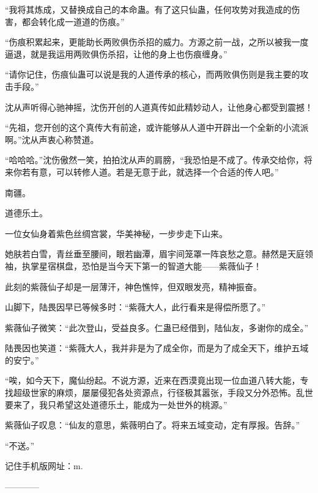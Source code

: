 \begin{this_body}
“我将其炼成，又替换成自己的本命蛊。有了这只仙蛊，任何攻势对我造成的伤害，都会转化成一道道的伤痕。”

“伤痕积累起来，更能助长两败俱伤杀招的威力。方源之前一战，之所以被我一度逼退，就是我运用两败俱伤杀招，让他的身上也伤痕缠身。”

“请你记住，伤痕仙蛊可以说是我的人道传承的核心，而两败俱伤则是我主要的攻击手段。”

沈从声听得心驰神摇，沈伤开创的人道真传如此精妙动人，让他身心都受到震撼！

“先祖，您开创的这个真传大有前途，或许能够从人道中开辟出一个全新的小流派啊。”沈从声衷心称赞道。

“哈哈哈。”沈伤傲然一笑，拍拍沈从声的肩膀，“我恐怕是不成了。传承交给你，将来你若有意，可以转修人道。若是无意于此，就选择一个合适的传人吧。”

南疆。

道德乐土。

一位女仙身着紫色丝绸宫裳，华美神秘，一步步走下山来。

她肤若白雪，青丝垂至腰间，眼若幽潭，眉宇间笼罩一阵哀愁之意。赫然是天庭领袖，执掌星宿棋盘，恐怕是当今天下第一的智道大能——紫薇仙子！

此刻的紫薇仙子却是一层薄汗，神色憔悴，但双眼发亮，精神振奋。

山脚下，陆畏因早已等候多时：“紫薇大人，此行看来是得偿所愿了。”

紫薇仙子微笑：“此次登山，受益良多。仁蛊已经借到，陆仙友，多谢你的成全。”

陆畏因也笑道：“紫薇大人，我并非是为了成全你，而是为了成全天下，维护五域的安宁。”

“唉，如今天下，魔仙纷起。不说方源，近来在西漠竟出现一位血道八转大能，专找超级世家的麻烦，屡屡侵犯各处资源点，行径极其嚣张，手段又分外恐怖。乱世要来了，我只希望这处道德乐土，能成为一处世外的桃源。”

紫薇仙子叹息：“仙友的意思，紫薇明白了。将来五域变动，定有厚报。告辞。”

“不送。”

记住手机版网址：m.

------------

\end{this_body}


